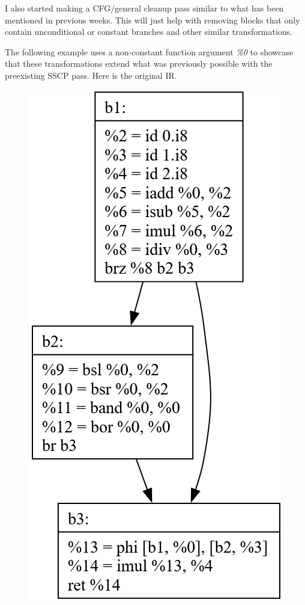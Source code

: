 \documentclass[11pt, a4paper, titlepage]{article}
\begin{document}
I also started making a CFG/general cleanup pass similar to what has been mentioned in previous weeks. This will just help with removing blocks that only contain unconditional or constant branches and other similar transformations.

The following example uses a non-constant function argument \textit{\%0} to showcase that these transformations extend what was previously possible with the preexisting SSCP pass. Here is the original IR.

\begin{figure}[H]
  \centering
  \includegraphics[scale=0.3]{images/i21.png}
\end{figure}
\end{document}
